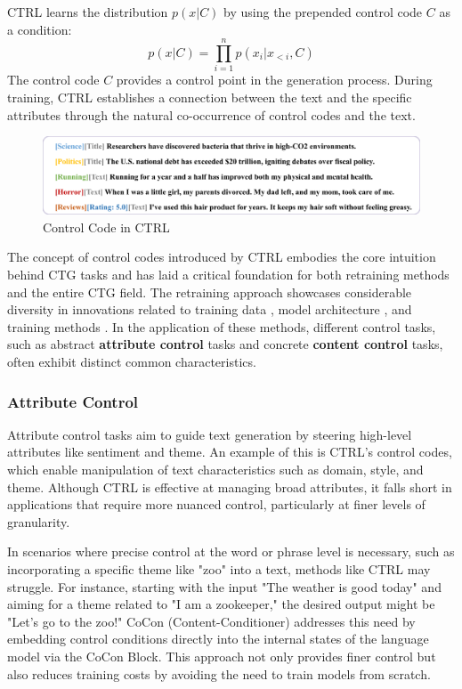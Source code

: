 \documentclass[acmsmall, screen]{acmart}
\begin{document}
CTRL learns the distribution \(p(x | C)\) by using the prepended control code \(C\) as a condition:
\begin{equation}
p(x | C) = \prod_{i=1}^{n} p(x_i | x_{<i}, C)
\end{equation}
The control code \(C\) provides a control point in the generation process. During training, CTRL establishes a connection between the text and the specific attributes through the natural co-occurrence of control codes and the text.

\begin{figure}[h]
    \centering
    \includegraphics[width=\textwidth]{figures/ctrl.pdf}
    \caption{Control Code in CTRL}
    \label{fig:ctrl}
\end{figure}

The concept of control codes introduced by CTRL embodies the core intuition behind CTG tasks and has laid a critical foundation for both retraining methods and the entire CTG field. The retraining approach showcases considerable diversity in innovations related to training data \cite{keskar_arxiv19_Ctrl}, model architecture \cite{chan_iclr21_CoCon}, and training methods \cite{he_emnlp21_CBART}. In the application of these methods, different control tasks, such as abstract \textbf{attribute control} tasks and concrete \textbf{content control} tasks, often exhibit distinct common characteristics.

\subsubsection{\textbf{Attribute Control}}
Attribute control tasks aim to guide text generation by steering high-level attributes like sentiment and theme. An example of this is CTRL’s control codes, which enable manipulation of text characteristics such as domain, style, and theme. Although CTRL is effective at managing broad attributes, it falls short in applications that require more nuanced control, particularly at finer levels of granularity.

In scenarios where precise control at the word or phrase level is necessary, such as incorporating a specific theme like "zoo" into a text, methods like CTRL may struggle. For instance, starting with the input "The weather is good today" and aiming for a theme related to "I am a zookeeper," the desired output might be "Let’s go to the zoo!" CoCon (Content-Conditioner) \cite{chan_iclr21_CoCon} addresses this need by embedding control conditions directly into the internal states of the language model via the CoCon Block. This approach not only provides finer control but also reduces training costs by avoiding the need to train models from scratch.
\end{document}
